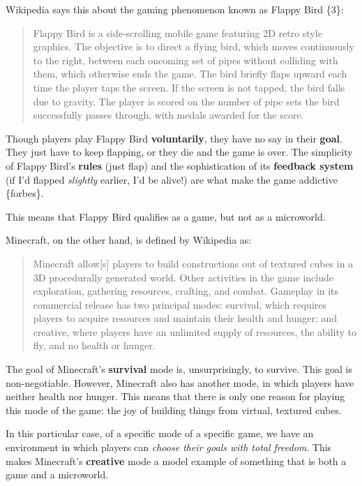 Wikipedia says this about the gaming phenomenon known as Flappy Bird
\{3\}:

\begin{quote}
Flappy Bird is a side-scrolling mobile game featuring 2D retro style
graphics. The objective is to direct a flying bird, which moves
continuously to the right, between each oncoming set of pipes without
colliding with them, which otherwise ends the game. The bird briefly
flaps upward each time the player taps the screen. If the screen is not
tapped, the bird falls due to gravity. The player is scored on the
number of pipe sets the bird successfully passes through, with medals
awarded for the score.
\end{quote}

Though players play Flappy Bird \textbf{voluntarily}, they have no say
in their \textbf{goal}. They just have to keep flapping, or they die and
the game is over. The simplicity of Flappy Bird's \textbf{rules} (just
flap) and the sophistication of its \textbf{feedback system} (if I'd
flapped \emph{slightly} earlier, I'd be alive!) are what make the game
addictive \{forbes\}.

This means that Flappy Bird qualifies as a game, but not as a
microworld.

Minecraft, on the other hand, is defined by Wikipedia as:

\begin{quote}
Minecraft allow{[}s{]} players to build constructions out of textured
cubes in a 3D procedurally generated world. Other activities in the game
include exploration, gathering resources, crafting, and combat. Gameplay
in its commercial release has two principal modes: survival, which
requires players to acquire resources and maintain their health and
hunger; and creative, where players have an unlimited supply of
resources, the ability to fly, and no health or hunger.
\end{quote}

The goal of Minecraft's \textbf{survival} mode is, unsurprisingly, to
survive. This goal is non-negotiable. However, Minecraft also has
another mode, in which players have neither health nor hunger. This
means that there is only one reason for playing this mode of the game:
the joy of building things from virtual, textured cubes.

In this particular case, of a specific mode of a specific game, we have
an environment in which players can \emph{choose their goals with total
freedom}. This makes Minecraft's \textbf{creative} mode a model example
of something that is both a game and a microworld.

